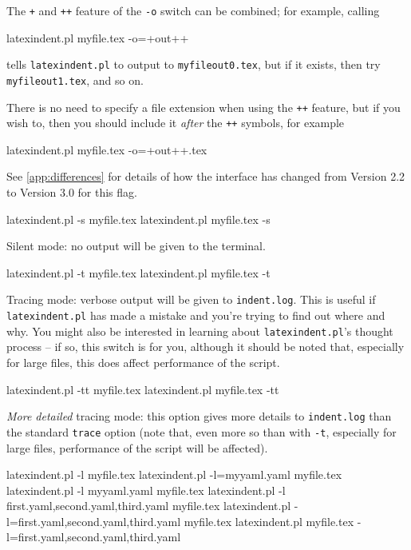 	The \texttt{+} and \texttt{++} feature of the \texttt{-o} switch can be combined; for example, calling
	\begin{commandshell}
latexindent.pl myfile.tex -o=+out++
\end{commandshell}
	tells \texttt{latexindent.pl} to output to \texttt{myfileout0.tex}, but if it exists, then
	try \texttt{myfileout1.tex}, and so on.

	There is no need to specify a file extension when using the \texttt{++} feature, but if you wish to,
	then you should include it \emph{after} the \texttt{++} symbols, for example
	\begin{commandshell}
latexindent.pl myfile.tex -o=+out++.tex
\end{commandshell}

	See \vref{app:differences} for details of how the interface has changed
	from Version 2.2 to Version 3.0 for this flag.
	\begin{commandshell}
latexindent.pl -s myfile.tex
latexindent.pl myfile.tex -s
      \end{commandshell}

	Silent mode: no output will be given to the terminal.

	\begin{commandshell}
latexindent.pl -t myfile.tex
latexindent.pl myfile.tex -t
      \end{commandshell}

	\label{page:traceswitch}
	Tracing mode: verbose output will be given to \texttt{indent.log}. This
	is useful if \texttt{latexindent.pl} has made a mistake and you're
	trying to find out where and why. You might also be interested in learning
	about \texttt{latexindent.pl}'s thought process -- if so, this
	switch is for you, although it should be noted that, especially for large files, this does affect
	performance of the script.

	\begin{commandshell}
latexindent.pl -tt myfile.tex
latexindent.pl myfile.tex -tt
      \end{commandshell}

	\emph{More detailed} tracing mode: this option gives more details to \texttt{indent.log}
	than the standard \texttt{trace} option (note that, even more so than with \texttt{-t},
	especially for large files, performance of the script will be affected).

	\begin{commandshell}
latexindent.pl -l myfile.tex
latexindent.pl -l=myyaml.yaml myfile.tex
latexindent.pl -l myyaml.yaml myfile.tex
latexindent.pl -l first.yaml,second.yaml,third.yaml myfile.tex
latexindent.pl -l=first.yaml,second.yaml,third.yaml myfile.tex
latexindent.pl myfile.tex -l=first.yaml,second.yaml,third.yaml 
      \end{commandshell}

